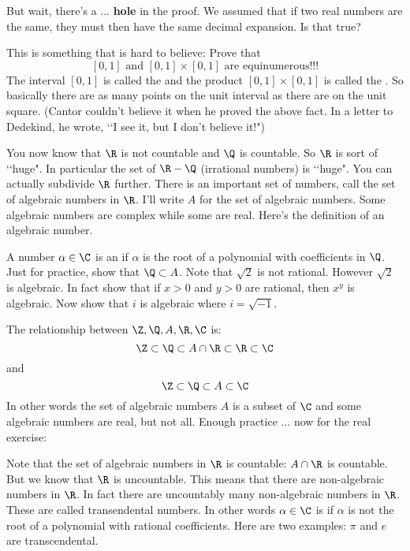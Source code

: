But wait, there's a ... \textbf{hole} in the proof. We assumed that if
two real numbers are the same, they must then have the same decimal
expansion. Is that true?








  This is something that is hard to believe:
  Prove that
  \[
  \text{$[0,1]$ and $[0,1] \times [0,1]$ are equinumerous!!!}
  \]
  The interval $[0,1]$ is called the 
  and the product $[0,1] \times [0,1]$ is called the .
  So basically there are as many points on the unit interval
  as there are on the unit square.
  (Cantor couldn't believe it when he proved the above fact.
  In a letter to Dedekind, he wrote,
  \lq\lq I see it, but I don’t believe it!")









You now know that $\R$ is not countable and $\Q$ is countable.
So $\R$ is sort of \lq\lq huge".
In particular the set of $\R - \Q$ (irrational numbers) is \lq\lq huge".
You can actually
subdivide $\R$ further.
There is an important set of numbers, call the
set of algebraic numbers in $\R$.
I'll write $A$ for the set of algebraic numbers.
Some algebraic numbers are complex while some are real.
Here's the definition of an algebraic number.

A number $\alpha \in \C$ is an 
if $\alpha$ is the root of a polynomial with coefficients in $\Q$.
Just for practice, show that $\Q \subset A$.
Note that $\sqrt{2}$ is not rational.
However $\sqrt{2}$ is algebraic.
In fact show that if $x > 0$ and $y > 0$ are rational, then
$x^y$ is algebraic.
Now show that $i$ is algebraic where $i = \sqrt{-1}$.

The relationship between $\Z, \Q, A, \R, \C$ is:
\[
\Z \subset \Q \subset A \cap \R \subset \R \subset \C
\]
and
\[
\Z \subset \Q \subset A \subset \C
\]
In other words the set of algebraic numbers $A$ is a subset of $\C$
and some algebraic numbers are real, but not all.
Enough practice ... now for the real exercise:



Note that the set of algebraic numbers in $\R$ is countable:
$A \cap \R$ is countable.
But we know that $\R$ is uncountable.
This means that there are non-algebraic numbers in $\R$.
In fact there are uncountably many non-algebraic numbers in $\R$.
These are called transendental numbers.
In other words $\alpha \in \C$ is 
if $\alpha$ is not the root of a polynomial with rational coefficients.
Here are two examples: $\pi$ and $e$ are transcendental.

